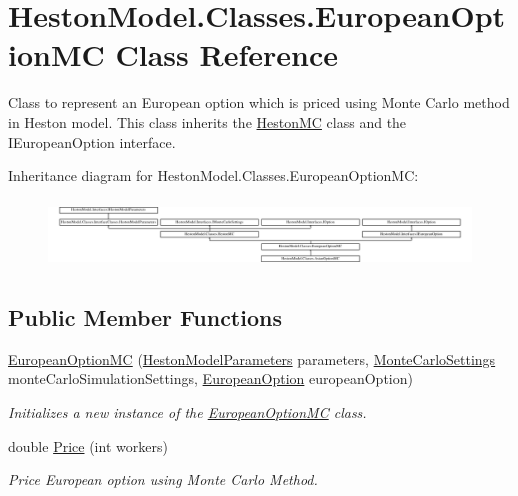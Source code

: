 \hypertarget{class_heston_model_1_1_classes_1_1_european_option_m_c}{}\section{Heston\+Model.\+Classes.\+European\+Option\+MC Class Reference}
\label{class_heston_model_1_1_classes_1_1_european_option_m_c}


Class to represent an European option which is priced using Monte Carlo method in Heston model. This class inherits the \mbox{\hyperlink{class_heston_model_1_1_classes_1_1_heston_m_c}{Heston\+MC}} class and the I\+European\+Option interface.  


Inheritance diagram for Heston\+Model.\+Classes.\+European\+Option\+MC\+:\begin{figure}[H]
\begin{center}
\leavevmode
\includegraphics[height=1.832461cm]{class_heston_model_1_1_classes_1_1_european_option_m_c}
\end{center}
\end{figure}
\subsection*{Public Member Functions}
\begin{DoxyCompactItemize}
\item 
\mbox{\hyperlink{class_heston_model_1_1_classes_1_1_european_option_m_c_ad84627e82cbec3bf55a08521ecc7b049}{European\+Option\+MC}} (\mbox{\hyperlink{class_heston_model_1_1_classes_1_1_interface_classes_1_1_heston_model_parameters}{Heston\+Model\+Parameters}} parameters, \mbox{\hyperlink{class_heston_model_1_1_classes_1_1_interface_classes_1_1_monte_carlo_settings}{Monte\+Carlo\+Settings}} monte\+Carlo\+Simulation\+Settings, \mbox{\hyperlink{class_heston_model_1_1_classes_1_1_interface_classes_1_1_european_option}{European\+Option}} european\+Option)
\begin{DoxyCompactList}\small\item\em Initializes a new instance of the \mbox{\hyperlink{class_heston_model_1_1_classes_1_1_european_option_m_c}{European\+Option\+MC}} class. \end{DoxyCompactList}\item 
double \mbox{\hyperlink{class_heston_model_1_1_classes_1_1_european_option_m_c_a4bd94af335f0d8affa110c1f0fb9ee84}{Price}} (int workers)
\begin{DoxyCompactList}\small\item\em Price European option using Monte Carlo Method. \end{DoxyCompactList}\end{DoxyCompactItemize}
